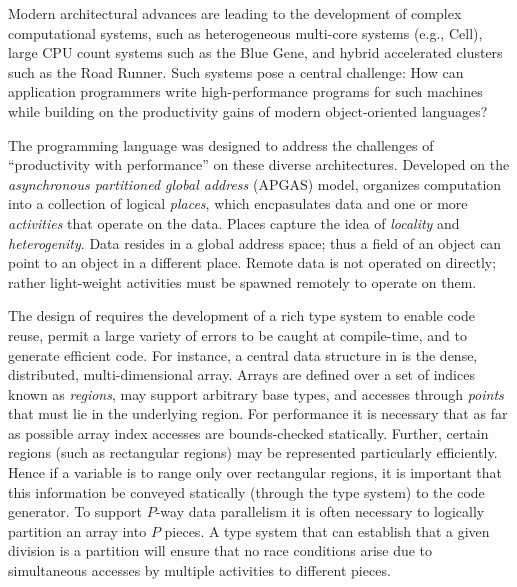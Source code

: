 

Modern architectural advances are leading to the development of
complex computational systems, such as heterogeneous multi-core
systems (e.g., Cell), large CPU count systems such as the Blue Gene,
and hybrid accelerated clusters such as the Road Runner.  Such systems
pose a central challenge: How can application programmers write
high-performance programs for such machines while building on the
productivity gains of modern object-oriented languages?

The \Xten{} programming language \cite{X10-concur,x10-oopsla05,x10} was
designed to address the challenges of ``productivity with
performance'' on these diverse architectures. Developed on
the {\em asynchronous partitioned global address} (APGAS) model, 
\Xten{} organizes computation into a collection of
logical {\em places}, which encpasulates data and one or more {\em
activities} that operate on the data. Places capture the idea of {\em
locality} 
and {\em heterogenity}. 
Data resides in a global address space; thus a
field of an object can point to an object in a different place. Remote
data is not operated on directly; rather light-weight activities
must be spawned remotely to operate on them.

The design of \Xten{} requires the development of a rich type system
to enable code reuse, permit a large variety of errors to be caught at
compile-time, and to generate efficient code. For instance, a central
data structure in \Xten{} is the dense, distributed, multi-dimensional
array. Arrays are defined over a set of indices known as {\em regions},
may support arbitrary base types, and accesses through {\em
points} that must lie in the underlying region. For performance it is
necessary that as far as possible array index accesses are
bounds-checked statically. Further, certain regions (such as
rectangular regions) may be represented particularly
efficiently. Hence if a variable is to range only over
rectangular regions, it is important that this information be conveyed
statically (through the type system) to the code 
generator. To support $P$-way data parallelism it is often necessary
to logically partition an array into $P$ pieces. A type system that
can establish that a given division is a partition will ensure that no
race conditions arise due to simultaneous accesses by
multiple activities to different pieces.

